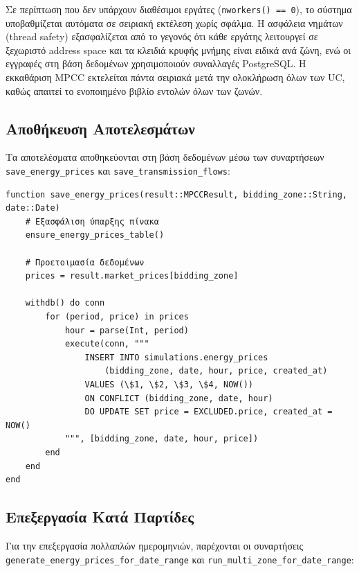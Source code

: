 Σε περίπτωση που δεν υπάρχουν διαθέσιμοι εργάτες (\texttt{nworkers() == 0}), το σύστημα υποβαθμίζεται αυτόματα σε σειριακή εκτέλεση χωρίς σφάλμα. Η ασφάλεια νημάτων (thread safety) εξασφαλίζεται από το γεγονός ότι κάθε εργάτης λειτουργεί σε ξεχωριστό address space και τα κλειδιά κρυφής μνήμης είναι ειδικά ανά ζώνη, ενώ οι εγγραφές στη βάση δεδομένων χρησιμοποιούν συναλλαγές PostgreSQL. Η εκκαθάριση MPCC εκτελείται πάντα σειριακά μετά την ολοκλήρωση όλων των UC, καθώς απαιτεί το ενοποιημένο βιβλίο εντολών όλων των ζωνών.

\subsection{Αποθήκευση Αποτελεσμάτων}
\label{subsec:saving-results}

Τα αποτελέσματα αποθηκεύονται στη βάση δεδομένων μέσω των συναρτήσεων \texttt{save\_energy\_prices} και \texttt{save\_transmission\_flows}:

\begin{samepage}
\begin{verbatim}
function save_energy_prices(result::MPCCResult, bidding_zone::String, date::Date)
    # Εξασφάλιση ύπαρξης πίνακα
    ensure_energy_prices_table()
    
    # Προετοιμασία δεδομένων
    prices = result.market_prices[bidding_zone]
    
    withdb() do conn
        for (period, price) in prices
            hour = parse(Int, period)
            execute(conn, """
                INSERT INTO simulations.energy_prices 
                    (bidding_zone, date, hour, price, created_at)
                VALUES (\$1, \$2, \$3, \$4, NOW())
                ON CONFLICT (bidding_zone, date, hour) 
                DO UPDATE SET price = EXCLUDED.price, created_at = NOW()
            """, [bidding_zone, date, hour, price])
        end
    end
end
\end{verbatim}
\end{samepage}

\subsection{Επεξεργασία Κατά Παρτίδες}
\label{subsec:batch-processing}

Για την επεξεργασία πολλαπλών ημερομηνιών, παρέχονται οι συναρτήσεις \texttt{generate\_energy\_prices\_for\_date\_range} και \texttt{run\_multi\_zone\_for\_date\_range}:

